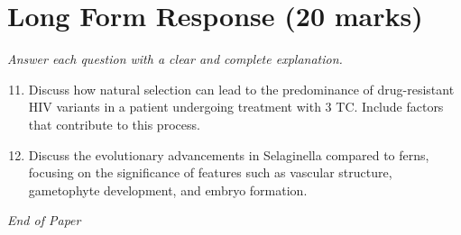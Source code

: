 \documentclass[12pt]{article}
\begin{document}
\section*{Long Form Response (20 marks)}
\textit{Answer each question with a clear and complete explanation.}
\begin{enumerate}[label=\arabic*.]
\setcounter{enumi}{10}
\item Discuss how natural selection can lead to the predominance of drug-resistant HIV variants in a patient undergoing treatment with 3 TC. Include factors that contribute to this process.
\item Discuss the evolutionary advancements in Selaginella compared to ferns, focusing on the significance of features such as vascular structure, gametophyte development, and embryo formation.
\end{enumerate}

\vfill
\noindent\textit{End of Paper}
\end{document}
